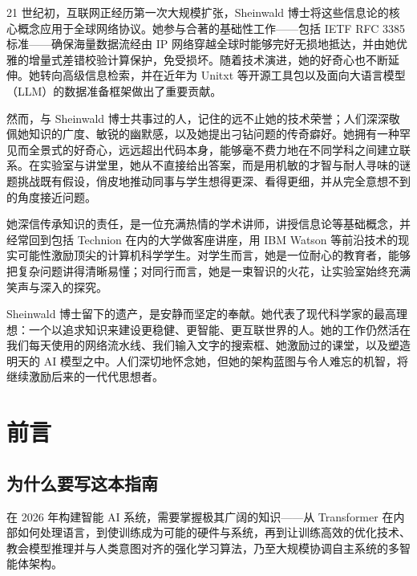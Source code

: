 \documentclass[11pt,a4paper,openany]{book}
\begin{document}
21 世纪初，互联网正经历第一次大规模扩张，Sheinwald 博士将这些信息论的核心概念应用于全球网络协议。她参与合著的基础性工作——包括 IETF RFC 3385 标准——确保海量数据流经由 IP 网络穿越全球时能够完好无损地抵达，并由她优雅的增量式差错校验计算保护，免受损坏。随着技术演进，她的好奇心也不断延伸。她转向高级信息检索，并在近年为 Unitxt 等开源工具包以及面向大语言模型（LLM）的数据准备框架做出了重要贡献。

然而，与 Sheinwald 博士共事过的人，记住的远不止她的技术荣誉；人们深深敬佩她知识的广度、敏锐的幽默感，以及她提出刁钻问题的传奇癖好。她拥有一种罕见而全景式的好奇心，远远超出代码本身，能够毫不费力地在不同学科之间建立联系。在实验室与讲堂里，她从不直接给出答案，而是用机敏的才智与耐人寻味的谜题挑战既有假设，俏皮地推动同事与学生想得更深、看得更细，并从完全意想不到的角度接近问题。

她深信传承知识的责任，是一位充满热情的学术讲师，讲授信息论等基础概念，并经常回到包括 Technion 在内的大学做客座讲座，用 IBM Watson 等前沿技术的现实可能性激励顶尖的计算机科学学生。对学生而言，她是一位耐心的教育者，能够把复杂问题讲得清晰易懂；对同行而言，她是一束智识的火花，让实验室始终充满笑声与深入的探究。

Sheinwald 博士留下的遗产，是安静而坚定的奉献。她代表了现代科学家的最高理想：一个以追求知识来建设更稳健、更智能、更互联世界的人。她的工作仍然活在我们每天使用的网络流水线、我们输入文字的搜索框、她激励过的课堂，以及塑造明天的 AI 模型之中。人们深切地怀念她，但她的架构蓝图与令人难忘的机智，将继续激励后来的一代代思想者。

\chapter*{前言}
\label{preface}

\section*{为什么要写这本指南}
\label{why-this-guide-exists}

在 2026 年构建智能 AI 系统，需要掌握极其广阔的知识——从 Transformer 在内部如何处理语言，到使训练成为可能的硬件与系统，再到让训练高效的优化技术、教会模型推理并与人类意图对齐的强化学习算法，乃至大规模协调自主系统的多智能体架构。
\end{document}
